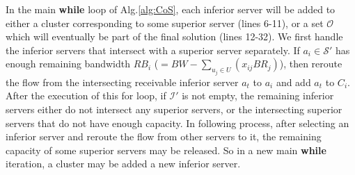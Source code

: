 \documentclass[journal]{IEEEtran}
\begin{document}
In the main \textbf{while} loop of Alg.\ref{alg:CoS}, each inferior server will be added to either a cluster corresponding to some superior server (lines 6-11), or a set  $\mathcal{O}$ which will eventually be part of the final solution (lines 12-32). 
We first handle the inferior servers that intersect with a superior server separately. If $a_i \in \mathcal{S}'$ has enough remaining bandwidth $RB_i$ ($=BW-\sum\nolimits_{u_j \in U}{(x_{ij}BR_j)}$), then reroute the flow from the intersecting receivable inferior server $a_t$ to $a_i$ and add $a_t$ to $C_i$. After the execution of this for loop, if $\mathcal{I}'$ is not empty, the remaining inferior servers either do not intersect any superior servers, or the intersecting superior servers that do not have enough capacity. In following process, after selecting an inferior server and reroute the flow from other servers to it, the remaining capacity of some superior servers may be released. So in a new main \textbf{while} iteration, a cluster may be added a new inferior server.
\end{document}
